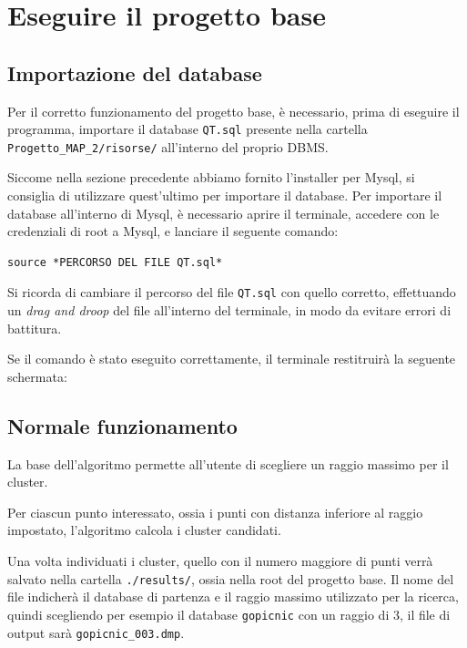 


\section{Eseguire il progetto base}
\subsection{Importazione del database}
Per il corretto funzionamento del progetto base, è necessario, prima di eseguire il programma, importare il database \texttt{QT.sql} presente nella cartella \texttt{Progetto\_MAP\_2/risorse/} all'interno del proprio DBMS.

Siccome nella sezione precedente abbiamo fornito l'installer per Mysql, si consiglia di utilizzare quest'ultimo per importare il database. Per importare il database all'interno di Mysql, è necessario aprire il terminale, accedere con le credenziali di root a Mysql, e lanciare il seguente comando:

\begin{verbatim}
source *PERCORSO DEL FILE QT.sql*
\end{verbatim}

\begin{tcolorbox}[  colback=white!5!white, colframe=gray, title={Avvertenza} ]

    Si ricorda di cambiare il percorso del file \texttt{QT.sql} con quello corretto, effettuando un \textit{drag and droop} del file all'interno del terminale, in modo da evitare errori di battitura. 
    
\end{tcolorbox}

Se il comando è stato eseguito correttamente, il terminale restitruirà la seguente schermata:


\subsection{Normale funzionamento}

La base dell'algoritmo permette all'utente di scegliere un raggio massimo per il cluster. 

Per ciascun punto interessato, ossia i punti con distanza inferiore al raggio impostato, l'algoritmo calcola i cluster candidati.

Una volta individuati i cluster, quello con il numero maggiore di punti verrà salvato nella cartella \texttt{./results/}, ossia nella root del progetto base. Il nome del file indicherà il database di partenza e il raggio massimo utilizzato per la ricerca, quindi scegliendo per esempio il database \texttt{gopicnic} con un raggio di 3, il file di output sarà \texttt{gopicnic\_003.dmp}.

